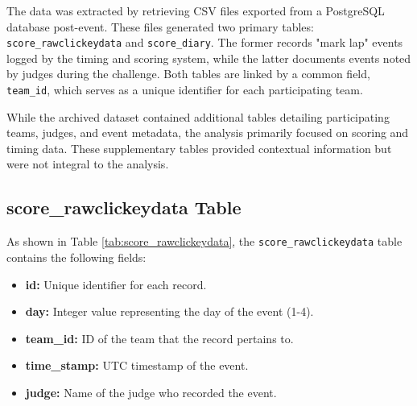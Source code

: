 \documentclass[11pt]{article}
\begin{document}
The data was extracted by retrieving CSV files exported from a PostgreSQL database post-event. These files generated two primary tables: \texttt{score\_rawclickeydata} and \texttt{score\_diary}. The former records "mark lap" events logged by the timing and scoring system, while the latter documents events noted by judges during the challenge. Both tables are linked by a common field, \texttt{team\_id}, which serves as a unique identifier for each participating team.

While the archived dataset contained additional tables detailing participating teams, judges, and event metadata, the analysis primarily focused on scoring and timing data. These supplementary tables provided contextual information but were not integral to the analysis.

\subsection{score\_rawclickeydata Table}

As shown in Table \ref{tab:score_rawclickeydata}, the \texttt{score\_rawclickeydata} table contains the following fields:

\begin{itemize}
    \item \textbf{id:} Unique identifier for each record.
    \item \textbf{day:} Integer value representing the day of the event (1-4).
    \item \textbf{team\_id:} ID of the team that the record pertains to.
    \item \textbf{time\_stamp:} UTC timestamp of the event.
    \item \textbf{judge:} Name of the judge who recorded the event.
\end{itemize}
\end{document}
